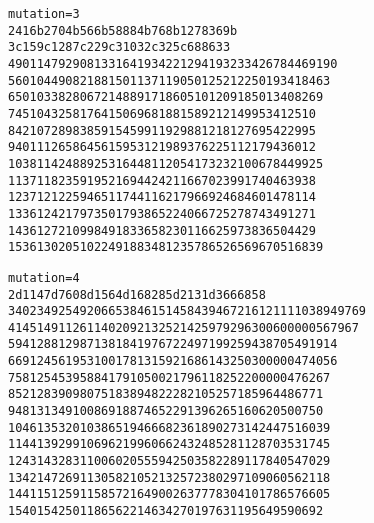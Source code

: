 \begin{alltt}
mutation=3
2   416    b  2704     b   566    b  58884      b   768    b  1278369       b
3     c  159     c  1287     c  229      c  31032     c  325        c  688633
4    90  114   792   908   133  164  19342  21294   193  233   426784  469190
5    60  104   490   821    88  150  11371  19050   125  212   250193  418463
6    50  103   382   806    72  148   8917  18605   101  209   185013  408269
7    45  104   325   817    64  150   6968  18815    89  212   149953  412510
8    42  107   289   838    59  154   5991  19298    81  218   127695  422995
9    40  111   265   864    56  159   5312  19893    76  225   112179  436012
10   38  114   248   892    53  164   4811  20541    73  232   100678  449925
11   37  118   235   919    52  169   4424  21166    70  239    91740  463938
12   37  121   225   946    51  174   4116  21796    69  246    84601  478114
13   36  124   217   973    50  179   3865  22406    67  252    78743  491271
14   36  127   210   998    49  183   3658  23011    66  259    73836  504429
15   36  130   205  1022    49  188   3481  23578    65  265    69670  516839

mutation=4
2     d 1147     d  7608     d 1564      d 168285     d 2131        d 3666858
3   402  349  2549  2066   538  461  51458  43946   721  612  1111038  949769
4   145  149  1126  1140   209  213  25214  25979   296  300   600000  567967
5    94  128   812   987   138  184  19767  22497   199  259   438705  491914
6    69  124   561   953   100  178  13159  21686   143  250   300000  474056
7    58  125   453   958    84  179  10500  21796   118  252   200000  476267
8    52  128   390   980    75  183   8948  22282   105  257   185964  486771
9    48  131   349  1008    69  188   7465  22913    96  265   160620  500750
10   46  135   320  1038    65  194   6668  23618    90  273   142447  516039
11   44  139   299  1069    62  199   6066  24324    85  281   128703  531745
12   43  143   283  1100    60  205   5594  25035    82  289   117840  547029
13   42  147   269  1130    58  210   5213  25723    80  297   109060  562118
14   41  151   259  1158    57  216   4900  26377    78  304   101786  576605
15   40  154   250  1186    56  221   4634  27019    76  311    95649  590692



\end{alltt}
